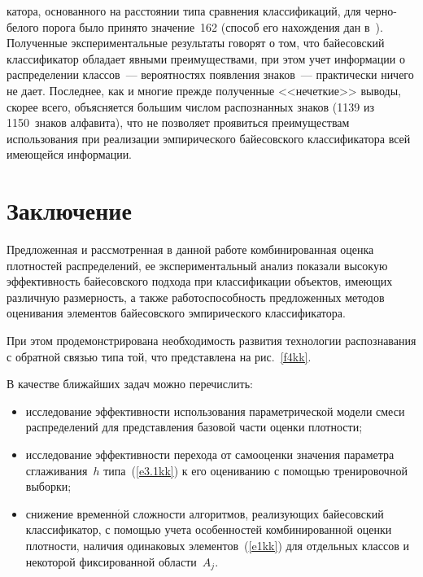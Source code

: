 \begin{multicols}{2}

\noindent
катора, основанного на расстоянии типа сравнения классификаций, для черно-белого порога было
 принято значение~162 (способ его нахождения дан 
в~\cite{6kk}). 
%
Полученные экспериментальные результаты говорят о том, что байесовский 
классификатор обладает явными преимуществами, при этом учет информации о распределении 
классов~--- вероятностях появления знаков~--- практически ничего не дает. Последнее, как и многие 
прежде полученные <<нечеткие>> выводы, скорее всего, объясняется большим числом 
распознанных знаков (1139 из 1150~знаков алфавита), что не позволяет проявиться 
преимуществам использования при реализации эмпирического байесовского классификатора всей 
имеющейся информации. 

\vspace*{-6pt}
 
\section{Заключение}

      Предложенная и рассмотренная в данной работе комбинированная оценка плотностей 
распределений, ее экспериментальный анализ показали высокую эффективность байесовского 
подхода при классификации объектов, имеющих различную размерность, а также 
работоспособность предложенных методов оценивания элементов байесовского эмпирического 
классификатора.
      
      При этом продемонстрирована необходимость развития технологии распознавания с 
обратной связью типа той, что представлена на рис.~\ref{f4kk}.
       
      В качестве ближайших задач можно пе\-ре\-чис\-лить:
      \begin{itemize}
\item исследование эффективности использования параметрической модели смеси распределений 
для представления базовой части оценки плотности;
\item исследование эффективности перехода от самооценки значения параметра сглаживания~$h$ 
типа~(\ref{e3.1kk}) к его оцениванию с помощью тренировочной выборки;
\item снижение временн$\acute{\mbox{о}}$й сложности алгоритмов, реализующих байесовский классификатор, с 
помощью учета особенностей комбинированной оценки плотности, наличия одинаковых 
элементов~(\ref{e1kk}) для отдельных классов и некоторой фиксированной области~$A_j$. 
\end{itemize}


\end{multicols}
